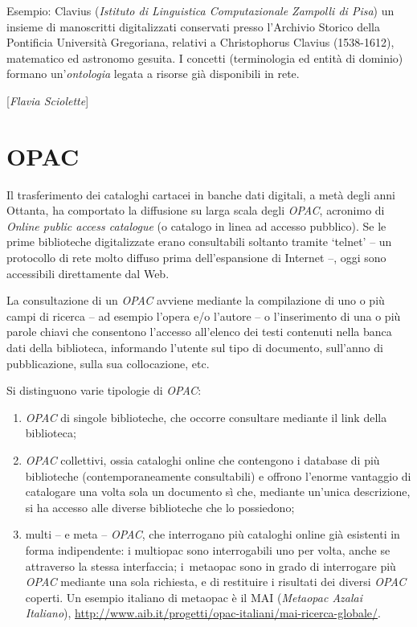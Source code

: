 {Esempio: Clavius (\emph{Istituto di Linguistica Computazionale Zampolli
di Pisa}) un insieme di manoscritti digitalizzati conservati presso
l'Archivio Storico della Pontificia Università Gregoriana, relativi a
Christophorus Clavius (1538-1612), matematico ed astronomo gesuita. I
concetti (terminologia ed entità di dominio) formano un'\emph{ontologia}
legata a risorse già disponibili in rete.

\hrulefill 

{[}\emph{Flavia Sciolette}{]}



\chapter{OPAC}

Il trasferimento dei cataloghi cartacei in banche dati digitali, a metà
degli anni Ottanta, ha comportato la diffusione su larga scala degli
\emph{OPAC}, acronimo di \emph{Online public access catalogue} (o
catalogo in linea ad accesso pubblico). Se le prime biblioteche
digitalizzate erano consultabili soltanto tramite `telnet' -- un
protocollo di rete molto diffuso prima dell'espansione di Internet --,
oggi sono accessibili direttamente dal Web.

La consultazione di un \emph{OPAC} avviene mediante la compilazione di
uno o più campi di ricerca -- ad esempio l'opera e/o l'autore -- o
l'inserimento di una o più parole chiavi che consentono l'accesso
all'elenco dei testi contenuti nella banca dati della biblioteca,
informando l'utente sul tipo di documento, sull'anno di pubblicazione,
sulla sua collocazione, etc.

Si distinguono varie tipologie di \emph{OPAC}:

\begin{enumerate}
\def\labelenumi{\arabic{enumi}.}
\item
  \emph{OPAC} di singole biblioteche, che occorre consultare mediante il
  link della biblioteca;
\item
  \emph{OPAC} collettivi, ossia cataloghi online che contengono i
  database di più biblioteche (contemporaneamente consultabili) e
  offrono l'enorme vantaggio di catalogare una volta sola un documento
  sì che, mediante un'unica descrizione, si ha accesso alle diverse
  biblioteche che lo possiedono;
\item
  multi -- e meta -- \emph{OPAC}, che interrogano più cataloghi online
  già esistenti in forma indipendente: i multiopac sono interrogabili
  uno per volta, anche se attraverso la stessa interfaccia; i~metaopac
  sono in grado di interrogare più \emph{OPAC} mediante una sola
  richiesta, e di restituire i risultati dei diversi \emph{OPAC}
  coperti. Un esempio italiano di metaopac è il MAI (\emph{Metaopac
  Azalai Italiano}),
  \url{http://www.aib.it/progetti/opac-italiani/mai-ricerca-globale/}.
\end{enumerate}

}
